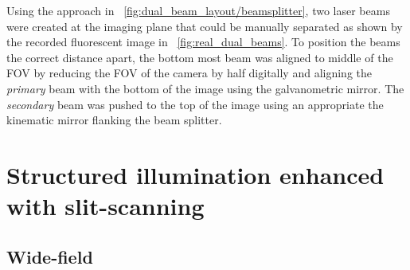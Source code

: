 Using the approach in \figurename~\ref{fig:dual_beam_layout/beamsplitter}, two laser beams were created at the imaging plane that could be manually separated as shown by the recorded fluorescent image in \figurename~\ref{fig:real_dual_beams}.
To position the beams the correct distance apart, the bottom most beam was aligned to middle of the \gls{FOV} by reducing the \gls{FOV} of the camera by half digitally and aligning the \emph{primary} beam with the bottom of the image using the galvanometric mirror.
The \emph{secondary} beam was pushed to the top of the image using an appropriate the kinematic mirror flanking the beam splitter.
%  
%  
\section{Structured illumination enhanced with \gls{slit-scanning}}

\subsection{Wide-field}


